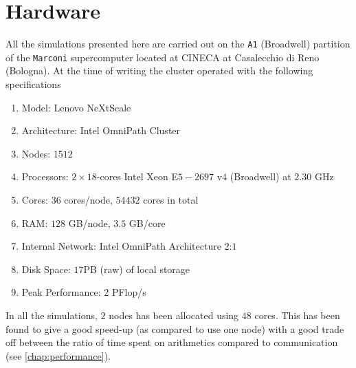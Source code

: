 \section{Hardware}
%
All the simulations presented here are carried out on the \texttt{A1} (Broadwell) partition of the \texttt{Marconi} supercomputer located at CINECA at Casalecchio di Reno (Bologna).
At the time of writing the cluster operated with the following specifications \cite{Marconi2016Web}
%
\begin{enumerate}[noitemsep]
    \item Model: Lenovo NeXtScale
    \item Architecture: Intel OmniPath Cluster
    \item Nodes: $1512$
    \item Processors: $2\times18$-cores Intel Xeon E$5-2697$ v$4$ (Broadwell) at $2.30$ GHz
    \item Cores: $36$ cores/node, $54432$ cores in total
    \item RAM: $128$ GB/node, $3.5$ GB/core
    \item Internal Network: Intel OmniPath Architecture $2$:$1$
    \item Disk Space: $17$PB (raw) of local storage
    \item Peak Performance: $2$ PFlop/s
\end{enumerate}
%
In all the simulations, $2$ nodes has been allocated using $48$ cores.
This has been found to give a good speed-up (as compared to use one node) with a good trade off between the ratio of time spent on arithmetics compared to communication (see \cref{chap:performance}).
